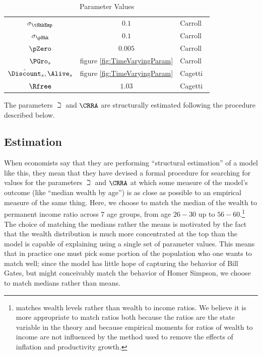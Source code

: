 \documentclass[titlepage]{\econtex}
\begin{document}
\begin{table}[h]
\caption{Parameter Values}\label{table:StrEstParams}
\begin{center}
\begin{tabular}{ccl}
\hline\hline
$\sigma _{\tShkEmp}$    & $0.1$ & Carroll~\citeyearpar{carroll:brookings}
\\ $\sigma _{\pShk}$   & $0.1$ & Carroll~\citeyearpar{carroll:brookings}
\\ $\pZero$           & $0.005$  & Carroll~\citeyearpar{carroll:brookings}
\\ $\PGro_{s}$        & figure \ref{fig:TimeVaryingParam} & Carroll~\citeyearpar{carrollBSLCPIH}
\\ $\hat{\Discount}_{s},\Alive_{s}$ & figure \ref{fig:TimeVaryingParam} & Cagetti~\citeyearpar{cagettiWprofiles}
\\$\Rfree$            & $1.03$  & Cagetti~\citeyearpar{cagettiWprofiles}\\
\hline
\end{tabular}
\end{center}
\end{table}

The parameters ${\beth}$ and $\CRRA$ are structurally estimated following the procedure described below.

\subsection{Estimation}

When economists say that they are performing ``structural estimation''
of a model like this, they mean that they have devised a
formal procedure for searching for values for the parameters ${\beth}$
and $\CRRA$ at which some measure of the model's outcome (like
``median wealth by age'') is as close as possible to an empirical measure
of the same thing. Here, we choose to match the median of the
wealth to permanent income ratio across 7 age groups, from age $26-30$
up to $56-60$.\footnote{\cite{cagettiWprofiles}
  matches wealth levels rather than wealth to income ratios. We
  believe it is more appropriate to match ratios both because the
  ratios are the state variable in the theory and because empirical
  moments for ratios of wealth to income are not influenced by the
  method used to remove the effects of inflation and productivity
  growth.} The choice of matching the medians rather the means is
motivated by the fact that the wealth distribution is much more
concentrated at the top than the model is capable of explaining using a single
set of parameter values.  This means that in practice one must pick
some portion of the population who one wants to match well; since the
model has little hope of capturing the behavior of Bill Gates, but
might conceivably match the behavior of Homer Simpson, we choose to
match medians rather than means.
\end{document}
